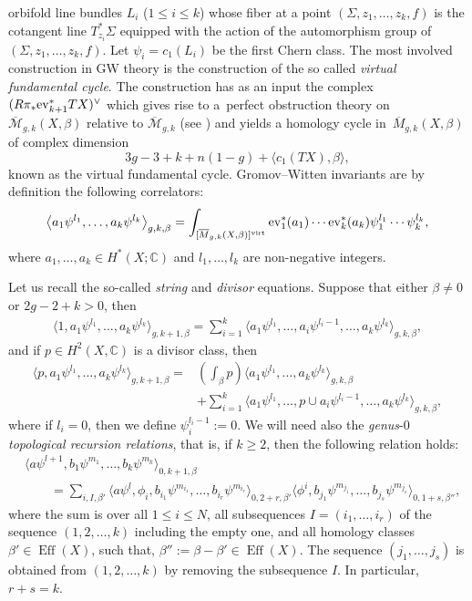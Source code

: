 \documentclass[pdftex]{sigma}
\numberwithin{equation}{section}
\newcommand{\CC}{\mathbb{C}}
\newcommand{\M}{\mathcal{M}}
\begin{document}
orbifold line bundles $L_i$ ($1\leq i\leq k$) whose fiber at a
point $(\Sigma,z_1,\dots,z_k,f)$ is the cotangent line
$T^*_{z_i}\Sigma$ equipped with the action of the automorphism group
of $(\Sigma,z_1,\dots,z_k,f)$. Let $\psi_i=c_1(L_i)$ be the first
Chern class. The most involved construction in GW theory is the
construction of the so called {\em virtual fundamental cycle}. The
construction has as an input the complex $(R\pi_*{\rm
 ev}_{k+1}^*TX)^\vee$ which gives rise to a~perfect obstruction
theory on $\overline{\M}_{g,k}(X,\beta)$ relative to
$\overline{\M}_{g,k}$ (see \cite{Be,BF_intnormalcone}) and yields a homology cycle in~$\overline{M}_{g,k}(X,\beta)$ of complex dimension
\[
3g-3 +k + n(1-g) + \langle c_1(TX),\beta\rangle,
\]
known as the virtual fundamental cycle. Gromov--Witten invariants are by
definition the following correlators:
\[
\big\langle a_1\psi^{l_1},\dots, a_k\psi^{l_k}\big\rangle_{g,k,\beta} =
\int_{[\overline{M}_{g,k}(X,\beta)]^{\rm virt}}
\operatorname{ev}_1^*(a_1)\cdots \operatorname{ev}_k^*(a_k)
\psi_1^{l_1}\cdots \psi_k^{l_k},
\]
where $a_1,\dots,a_k\in H^*(X;\CC)$ and $l_1,\dots,l_k$ are
non-negative integers.

Let us recall the so-called {\em string} and {\em divisor} equations. Suppose that either $\beta\neq 0$ or ${2g-2+k>0}$, then
\begin{align*}
\big\langle 1, a_1\psi^{l_1},\dots, a_k\psi^{l_k}\big\rangle_{g,k+1,\beta} =
\sum_{i=1}^k \big\langle
a_1\psi^{l_1},\dots, a_i\psi^{l_i-1}, \dots, a_k\psi^{l_k}\big\rangle_{g,k,\beta},
\end{align*}
and if $p\in H^2(X,\CC)$ is a divisor class, then
\begin{align*}
\big\langle p, a_1\psi^{l_1},\dots, a_k\psi^{l_k}\big\rangle_{g,k+1,\beta} ={} &
\left(\int_\beta p\right) \big\langle a_1\psi^{l_1},\dots, a_k\psi^{l_k}\big\rangle_{g,k,\beta} \\
&+
\sum_{i=1}^k \big\langle
a_1\psi^{l_1},\dots, p\cup a_i\psi^{l_i-1}, \dots, a_k\psi^{l_k}\big\rangle_{g,k,\beta},
\end{align*}
where if $l_i=0$, then we define $\psi_i^{l_i-1}:=0$. We will need
also the {\em genus}-0 {\em topological recursion relations}, that is,
if $k\geq 2$, then the following relation holds:
\begin{align*}
&\big\langle a \psi^{l+1}, b_1\psi^{m_1},\dots,
 b_k\psi^{m_k}
 \big\rangle_{0,k+1,\beta}
 \\
 &\qquad=
 \sum_{i, I,\beta'}\big\langle
 a \psi^l, \phi_i,
 b_{i_1} \psi^{m_{i_1}},\dots,
 b_{i_r} \psi^{m_{i_r}}\big\rangle_{0,2+r,\beta'}
\big\langle
\phi^i, b_{j_1} \psi^{m_{j_1}},\dots,
 b_{j_s} \psi^{m_{j_s}}\big\rangle_{0,1+s,\beta''},
\end{align*}
where the sum is over all $1\leq i\leq N$, all subsequences
$I=(i_1,\dots,i_r)$ of the sequence $(1,2,\dots,k)$ including the
empty one, and all homology
classes $\beta'\in \operatorname{Eff}(X)$, such that,
$\beta'':=\beta-\beta'\in \operatorname{Eff}(X)$. The sequence
$(j_1,\dots,j_s)$ is obtained from $(1,2,\dots,k)$ by removing the
subsequence $I$. In particular, $r+s=k$.
\end{document}
